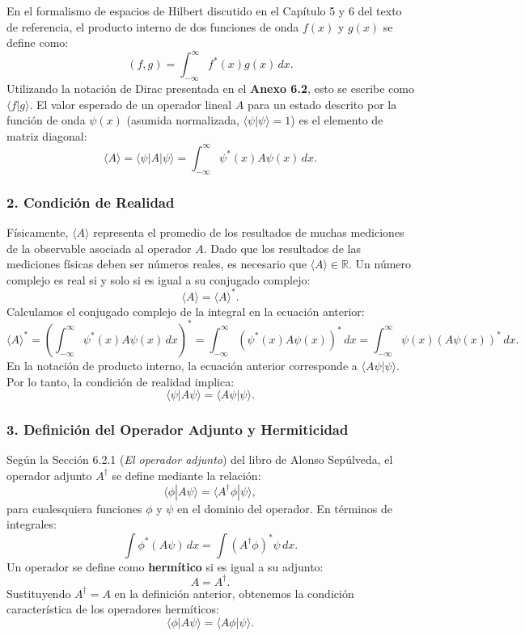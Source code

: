 \documentclass[a4paper]{article}
\begin{document}
En el formalismo de espacios de Hilbert discutido en el Capítulo 5 y 6 del texto de referencia, el producto interno de dos funciones de onda $f(x)$ y $g(x)$ se define como:
$$
(f, g) = \int_{-\infty}^{\infty} f^*(x) g(x) \, dx.
$$
Utilizando la notación de Dirac presentada en el \textbf{Anexo 6.2}, esto se escribe como $\langle f | g \rangle$. El valor esperado de un operador lineal $A$ para un estado descrito por la función de onda $\psi(x)$ (asumida normalizada, $\langle \psi | \psi \rangle = 1$) es el elemento de matriz diagonal:
$$
\langle A \rangle = \langle \psi | A | \psi \rangle = \int_{-\infty}^{\infty} \psi^*(x) A \psi(x) \, dx.
$$

\subsubsection{2. Condición de Realidad}

Físicamente, $\langle A \rangle$ representa el promedio de los resultados de muchas mediciones de la observable asociada al operador $A$. Dado que los resultados de las mediciones físicas deben ser números reales, es necesario que $\langle A \rangle \in \mathbb{R}$. Un número complejo es real si y solo si es igual a su conjugado complejo:
$$
\langle A \rangle = \langle A \rangle^*.
$$
Calculamos el conjugado complejo de la integral en la ecuación anterior:
$$
\langle A \rangle^* = \left( \int_{-\infty}^{\infty} \psi^*(x) A \psi(x) \, dx \right)^* = \int_{-\infty}^{\infty} \left( \psi^*(x) A \psi(x) \right)^* \, dx = \int_{-\infty}^{\infty} \psi(x) \left( A \psi(x) \right)^* \, dx.
$$
En la notación de producto interno, la ecuación anterior corresponde a $\langle A \psi | \psi \rangle$. Por lo tanto, la condición de realidad implica:
$$
\langle \psi | A \psi \rangle = \langle A \psi | \psi \rangle.
$$

\subsubsection{3. Definición del Operador Adjunto y Hermiticidad}

Según la Sección 6.2.1 (\textit{El operador adjunto}) del libro de Alonso Sepúlveda, el operador adjunto $A^\dagger$ se define mediante la relación:
$$
\langle \phi | A \psi \rangle = \langle A^\dagger \phi | \psi \rangle,
$$
para cualesquiera funciones $\phi$ y $\psi$ en el dominio del operador. En términos de integrales:
$$
\int \phi^* (A \psi) \, dx = \int (A^\dagger \phi)^* \psi \, dx.
$$
Un operador se define como \textbf{hermítico} si es igual a su adjunto:
$$
A = A^\dagger.
$$
Sustituyendo $A^\dagger = A$ en la definición anterior, obtenemos la condición característica de los operadores hermíticos:
$$
\langle \phi | A \psi \rangle = \langle A \phi | \psi \rangle.
$$
\end{document}
